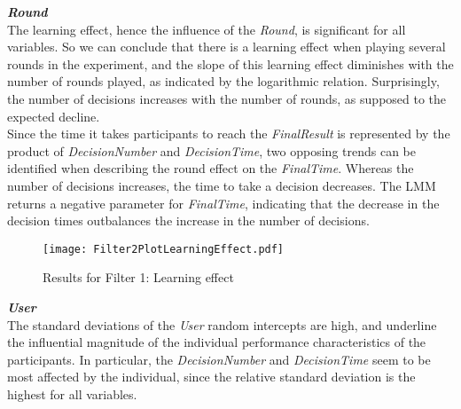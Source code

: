 \textbf{\textit{Round} }\\
The learning effect, hence the influence of the \textit{Round}, is significant for all variables. So we can conclude that there is a learning effect when playing several rounds in the experiment, and the slope of this learning effect diminishes with the number of rounds played, as indicated by the logarithmic relation. Surprisingly, the number of decisions increases with the number of rounds, as supposed to the expected decline. \\
Since the time it takes participants to reach the \textit{FinalResult} is represented by the product of \textit{DecisionNumber} and \textit{DecisionTime}, two opposing trends can be identified when describing the round effect on the \textit{FinalTime}. Whereas the number of decisions increases, the time to take a decision decreases. The \ac{LMM} returns a negative parameter for \textit{FinalTime},  indicating that the decrease in the decision times outbalances the increase in the number of decisions.  
\begin{figure}[H] %
\begin{center}
\texttt{[image: Filter2PlotLearningEffect.pdf]}  
  \caption[Results for Filter 1: Learning effect]{Results for Filter 1: Learning effect\footnotemark}
    \label{fig:Results for Filter 1: Learning effect} 
\end{center}
\end{figure}
\textbf{\textit{User} }\\
The standard deviations of the \textit{User} random intercepts are high, and underline the influential magnitude of the individual performance characteristics of the participants. In particular, the \textit{DecisionNumber} and \textit{DecisionTime} seem to be most affected by the individual, since the relative standard deviation is the highest for all variables. 

